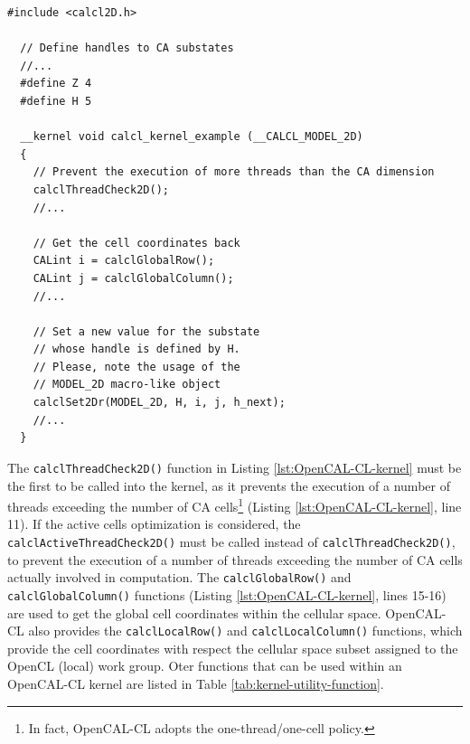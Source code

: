 \begin{lstlisting}[float,floatplacement=H, label=lst:OpenCAL-CL-kernel, caption=Example of OpenCAL-CL kernel.] 
  #include <calcl2D.h>

  // Define handles to CA substates
  //...
  #define Z 4
  #define H 5

  __kernel void calcl_kernel_example (__CALCL_MODEL_2D)
  {
    // Prevent the execution of more threads than the CA dimension
    calclThreadCheck2D();
    //...

    // Get the cell coordinates back
    CALint i = calclGlobalRow();
    CALint j = calclGlobalColumn();
    //...

    // Set a new value for the substate
    // whose handle is defined by H.
    // Please, note the usage of the
    // MODEL_2D macro-like object
    calclSet2Dr(MODEL_2D, H, i, j, h_next);
    //...
  }
\end{lstlisting}

The \verb'calclThreadCheck2D()' function in Listing
\ref{lst:OpenCAL-CL-kernel} must be the first to be called into the
kernel, as it prevents the execution of a number of threads exceeding
the number of CA cells\footnote{In fact, OpenCAL-CL adopts the
  one-thread/one-cell policy.} (Listing \ref{lst:OpenCAL-CL-kernel},
line 11). If the active cells optimization is considered, the
\verb'calclActiveThreadCheck2D()' must be called instead of
\verb'calclThreadCheck2D()', to prevent the execution of a number of
threads exceeding the number of CA cells actually involved in
computation. The \verb'calclGlobalRow()' and
\verb'calclGlobalColumn()' functions (Listing
\ref{lst:OpenCAL-CL-kernel}, lines 15-16) are used to get the global
cell coordinates within the cellular space. OpenCAL-CL also provides
the \verb'calclLocalRow()' and \verb'calclLocalColumn()' functions,
which provide the cell coordinates with respect the cellular space
subset assigned to the OpenCL (local) work group. Oter functions that
can be used within an OpenCAL-CL kernel are listed in Table
\ref{tab:kernel-utility-function}.


